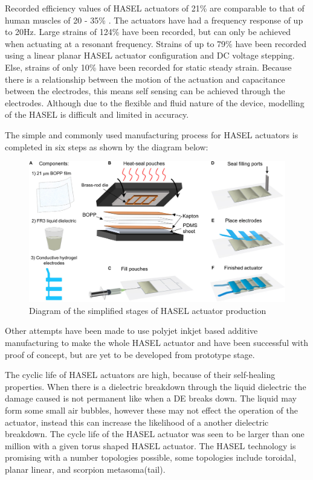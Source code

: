 Recorded efficiency values of HASEL actuators of 21\% are comparable to that of human muscles of 20 - 35\% \citep{Smith2005}. The actuators have had a frequency response of up to 20Hz. Large strains of 124\% have been recorded, but can only be achieved when actuating at a resonant frequency. Strains of up to 79\% have been recorded using a linear planar HASEL actuator configuration and DC voltage stepping.  Else, strains of only 10\% have been recorded for static steady strain\citep{Kellaris2018}.
Because there is a relationship between the motion of the actuation and capacitance between the electrodes, this means self sensing can be achieved through the electrodes. Although due to the flexible and fluid nature of the device, modelling of the HASEL is difficult and limited in accuracy.

The simple and commonly used manufacturing process for HASEL actuators is completed in six steps as shown by the diagram below:
\begin{figure}[h!]
  \centering
  \includegraphics[width=0.7\linewidth]{Figures/HASEL_manuf.jpg}
  \caption{Diagram of the simplified stages of HASEL actuator production\citep{Kellaris2018}}
  \label{fig:Artificial Muscle_HASEL_manf}
\end{figure}

Other attempts have been made to use polyjet inkjet based additive manufacturing to make the whole HASEL actuator and have been successful with proof of concept, but are yet to be developed from prototype stage\citep{Manionn.d.}. 

The cyclic life of HASEL actuators are high, because of their self-healing properties. When there is a dielectric breakdown through the liquid dielectric the damage caused is not permanent like when a DE breaks down. The liquid may form some small air bubbles, however these may not effect the operation of the actuator, instead this can increase the likelihood of a another dielectric breakdown. The cycle life of the HASEL actuator was seen to be larger than one million with a given torus shaped HASEL actuator\citep{Acome2018}. The HASEL technology is promising with a number topologies possible, some topologies include toroidal, planar linear\citep{Acome2018}, and scorpion metasoma(tail)\citep{Mitchell2019}.

